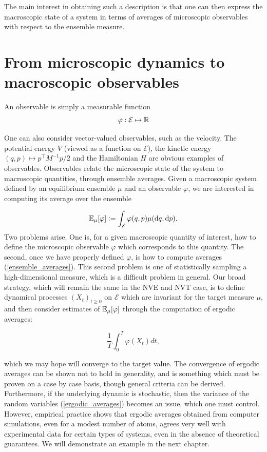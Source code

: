 The main interest in obtaining such a description is that one can then express the macroscopic state of a system in terms of averages of microscopic observables with respect to the ensemble measure.

\section{From microscopic dynamics to macroscopic observables}

\begin{definition}[Observables]
    An observable is simply a measurable function 
    $$\varphi : \mathcal E \mapsto \mathbb{R}$$

\end{definition}

One can also consider vector-valued observables, such as the velocity. The potential energy $V$ (viewed as a function on $\mathcal E$), the kinetic energy $(q,p) \mapsto p^\intercal M^{-1}p/2$ and the Hamiltonian $H$ are obvious examples of observables.
Observables relate the microscopic state of the system to macroscopic quantities, through ensemble averages. Given a macroscopic system defined by an equilibrium ensemble $\mu$ and an observable $\varphi$, we are interested in computing its average over the ensemble

\begin{equation}
    \label{ensemble_averages}
\mathbb{E}_\mu[\varphi] \mathrel{\mathop:}= \int_{\mathcal E} \varphi(q,p) \mu(\text dq,\text dp).
\end{equation}
Two problems arise. One is, for a given macroscopic quantity of interest, how to define the microscopic observable $\varphi$ which corresponds to this quantity. The second, once we have properly defined $\varphi$, is how to compute averages (\ref{ensemble_averages}). 
This second problem is one of statistically sampling a high-dimensional measure, which is a difficult problem in general. Our broad strategy, which will remain the same in the NVE and NVT case, is to define dynamical processes $(X_t)_{t\geq 0}$ on $\mathcal E$ which are invariant for the target measure $\mu$, and then consider estimates of $\mathbb{E}_{\mu}[\varphi]$ through the computation of ergodic averages:

\begin{equation}
\label{ergodic_averages}
 \frac{1}{T}\int_{0}^T \varphi(X_t)dt,
\end{equation}

which we may hope will converge to the target value. The convergence of ergodic averages can be shown not to hold in generality, and is something which must be proven on a case by case basis, though general criteria can be derived.
Furthermore, if the underlying dynamic is stochastic, then the variance of the random variables (\ref{ergodic_averages}) becomes an issue, which one must control.
However, empirical practice shows that ergodic averages obtained from computer simulations, even for a modest number of atoms, agrees very well with experimental data for certain types of systems, even in the absence of theoretical guarantees. We will demonstrate an example in the next chapter.